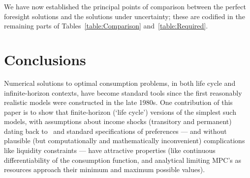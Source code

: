 \documentclass[BufferStockTheory]{subfiles}
\begin{document}

We have now established the principal points of comparison between the perfect foresight solutions and the solutions under uncertainty; these are codified in the remaining parts of Tables~\ref{table:Comparison} and~\ref{table:Required}.

\hypertarget{Factors-Defined-And-Compared}{}


\hypertarget{Required}{}


\newpage 
\hypertarget{Conclusions}{}
\section{Conclusions}

Numerical solutions to optimal consumption problems, in both life cycle and infinite-horizon contexts, have become standard tools since the first reasonably realistic models were constructed in the late 1980s.
One contribution of this paper is to show that finite-horizon (`life cycle') versions of the simplest such models, with assumptions about income shocks (transitory and permanent) dating back to~\cite{friedmanATheory} and standard specifications of preferences --- and without plausible (but computationally and mathematically inconvenient) complications like liquidity constraints --- have attractive properties (like continuous differentiability of the consumption function, and analytical limiting MPC's as resources approach their minimum and maximum possible values).%
\end{document}
